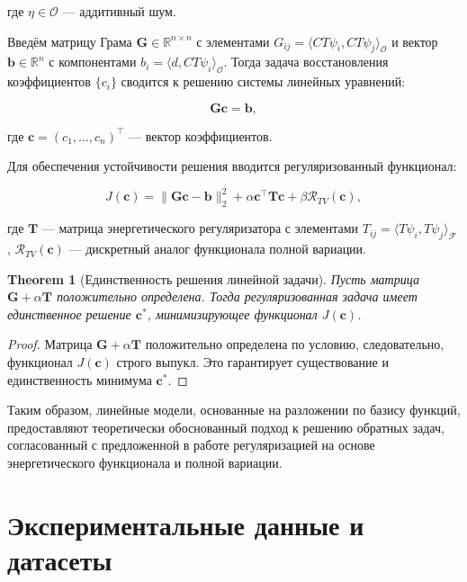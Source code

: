 \documentclass[sn-mathphys-num]{bst/sn-jnl}
\theoremstyle{thmstylethree}
\theoremstyle{thmstyletwo}
\theoremstyle{thmstyleone}
\newtheorem{theorem}{Theorem}
\begin{document}
где $\eta \in \mathcal{O}$ --- аддитивный шум.

Введём матрицу Грама $\mathbf{G} \in \mathbb{R}^{n \times n}$ с элементами $G_{ij} = \langle C T \psi_i, C T \psi_j \rangle_{\mathcal{O}}$ и вектор $\mathbf{b} \in \mathbb{R}^n$ с компонентами $b_i = \langle d, C T \psi_i \rangle_{\mathcal{O}}$. Тогда задача восстановления коэффициентов $\{c_i\}$ сводится к решению системы линейных уравнений:

\begin{equation}
    \mathbf{G} \mathbf{c} = \mathbf{b},
\end{equation}

где $\mathbf{c} = (c_1, \dots, c_n)^\top$ --- вектор коэффициентов.

Для обеспечения устойчивости решения вводится регуляризованный функционал:

\begin{equation}
    J(\mathbf{c}) = \|\mathbf{G} \mathbf{c} - \mathbf{b}\|_2^2 + \alpha \mathbf{c}^\top \mathbf{T} \mathbf{c} + \beta \mathcal{R}_{TV}(\mathbf{c}),
\end{equation}

где $\mathbf{T}$ --- матрица энергетического регуляризатора с элементами $T_{ij} = \langle T \psi_i, T \psi_j \rangle_{\mathcal{F}}$, $\mathcal{R}_{TV}(\mathbf{c})$ --- дискретный аналог функционала полной вариации.

\begin{theorem}[Единственность решения линейной задачи]
Пусть матрица $\mathbf{G} + \alpha \mathbf{T}$ положительно определена. Тогда регуляризованная задача имеет единственное решение $\mathbf{c}^*$, минимизирующее функционал $J(\mathbf{c})$.
\end{theorem}

\begin{proof}
Матрица $\mathbf{G} + \alpha \mathbf{T}$ положительно определена по условию, следовательно, функционал $J(\mathbf{c})$ строго выпукл. Это гарантирует существование и единственность минимума $\mathbf{c}^*$.
\end{proof}

Таким образом, линейные модели, основанные на разложении по базису функций, предоставляют теоретически обоснованный подход к решению обратных задач, согласованный с предложенной в работе регуляризацией на основе энергетического функционала и полной вариации.

\section{Экспериментальные данные и датасеты}
\end{document}
